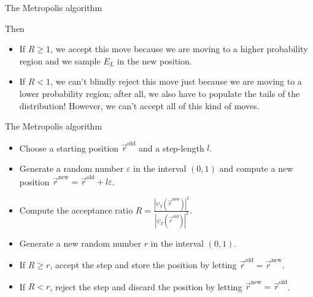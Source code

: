 \documentclass[10pt, compress, usetitleprogressbar, protectframetitle]{beamer}
\begin{document}
\begin{frame}{The Metropolis algorithm}
	
	Then
	
	\begin{itemize}[<+->]
		\item If $R \geq 1$, we accept this move because we are moving to a higher probability region and we sample $E_L$ in the new position.
		\item If $R < 1$, we can't blindly reject this move just because we are moving to a lower probability region; after all, we also have to populate the tails of the distribution! However, we can't accept all of this kind of moves.
	\end{itemize}
	
	

\end{frame}

\begin{frame}{The Metropolis algorithm}
	
	
	\begin{itemize}[<+->]
		\item Choose a starting position $\vec{r}^{\text{old}}$ and a step-length $l$.
		\item Generate a random number $\varepsilon$ in the interval $(0,1)$ and compute a new position $\vec{r}^{\text{new}} = \vec{r}^{\text{old}} + l\varepsilon$.
		\item Compute the acceptance ratio $R = \frac{|\psi_T(\vec{r}^{\text{new}})|^2}{|\psi_T(\vec{r}^{\text{old}})|^2}$.
		\item Generate a new random number $r$ in the interval $(0,1)$.
		\item If $R \geq r$, accept the step and store the position by letting $\vec{r}^{\text{old}} = \vec{r}^{\text{new}}$.
		\item If $R < r$, reject the step and  discard the position by letting $\vec{r}^{\text{new}} = \vec{r}^{\text{old}}$.
	\end{itemize}
	
\end{frame}
\end{document}
